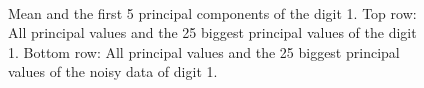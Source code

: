 \documentclass[a4paper, 12pt, titlepage]{article}
\begin{document}
\begin{figure}[H]
	\centering
	\\
	\caption{\protect{} Mean and the first 5 principal components of the digit 1. \protect{} Top row: All principal values and the 25 biggest principal values of the digit 1. Bottom row: All principal values and the 25 biggest principal values of the noisy data of digit 1.}
\end{figure}
\end{document}
